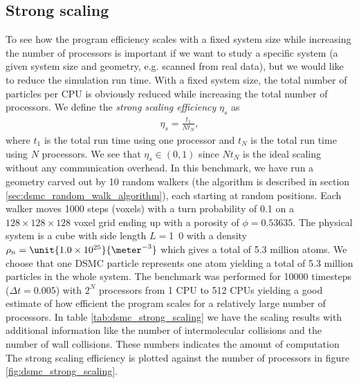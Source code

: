 \subsection{Strong scaling}
To see how the program efficiency scales with a fixed system size while increasing the number of processors is important if we want to study a specific system (a given system size and geometry, e.g. scanned from real data), but we would like to reduce the simulation run time. With a fixed system size, the total number of particles per CPU is obviously reduced while increasing the total number of processors. We define the \textit{strong scaling efficiency} $\eta_s$ as
\begin{align}
	\eta_s = \frac{t_1}{Nt_N},
\end{align}
where $t_1$ is the total run time using one processor and $t_N$ is the total run time using $N$ processors. We see that $\eta_s\in (0,1)$ since $Nt_N$ is the ideal scaling without any communication overhead. In this benchmark, we have run a geometry carved out by 10 random walkers (the algorithm is described in section \ref{sec:dsmc_random_walk_algorithm}), each starting at random positions. Each walker moves 1000 steps (voxels) with a turn probability of 0.1 on a $128\times128\times128$ voxel grid ending up with a porosity of $\phi=0.53635$. The physical system is a cube with side length $L=$\unit{1.0}{\micro\meter} with a density $\rho_n=\unit{1.0\e{25}}{\meter^{-3}}$ which gives a total of 5.3 million atoms. We choose that one DSMC particle represents one atom yielding a total of 5.3 million particles in the whole system. The benchmark was performed for 10000 timesteps ($\Delta t = 0.005$) with $2^N$ processors from 1 CPU to 512 CPUs yielding a good estimate of how efficient the program scales for a relatively large number of processors. In table \ref{tab:dsmc_strong_scaling} we have the scaling results with additional information like the number of intermolecular collisions and the number of wall collisions. These numbers indicates the amount of computation  The strong scaling efficiency is plotted against the number of processors in figure \ref{fig:dsmc_strong_scaling}.
